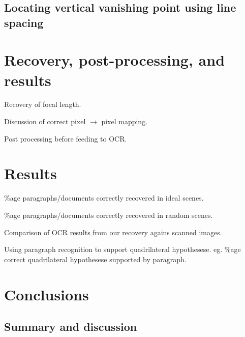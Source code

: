 \section{Locating vertical vanishing point using line spacing} %





\chapter{Recovery, post-processing, and results}


Recovery of focal length.

Discussion of correct pixel $\rightarrow$  pixel mapping.

Post processing before feeding to OCR.





\chapter{Results}


\%age paragraphs/documents correctly recovered in ideal scenes.

\%age paragraphs/documents correctly recovered in random scenes.

Comparison of OCR results from our recovery agains scanned images.

Using paragraph recognition to support quadrilateral hypothesese.
eg. \%age correct quadrilateral hypothesese supported by paragraph.




\chapter{Conclusions}




\section{Summary and discussion} %



